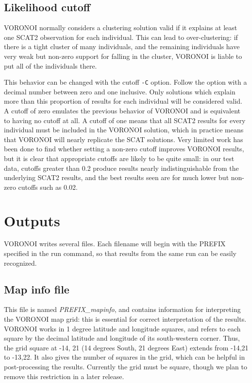 \documentclass[10pt,titlepage,times,letterpaper]{article}
\begin{document}
\subsection{Likelihood cutoff}

VORONOI normally considers a clustering solution valid if it explains at least
one SCAT2 observation for each individual.  This can lead to over-clustering:  if there
is a tight cluster of many individuals, and the remaining individuals have very weak but
non-zero support for falling in the cluster, VORONOI is liable to put all of the individuals
there.

This behavior can be changed with the cutoff {\tt -C} option.  Follow the option with
a decimal number between zero and one inclusive.  Only solutions which explain more
than this proportion of results for each individual will be considered valid.  A cutoff
of zero emulates the previous behavior of VORONOI and is equivalent to having no
cutoff at all.  A cutoff of one means that all SCAT2 results for every individual must
be included in the VORONOI solution, which in practice means that VORONOI will nearly
replicate the SCAT solutions.  Very limited
work has been done to find whether setting a non-zero cutoff improves VORONOI results,
but it is clear that appropriate cutoffs are likely to be quite small:  in our test
data, cutoffs greater than 0.2 produce results nearly indistinguishable from
the underlying SCAT2 results, and the best results seen are for much lower but non-zero
cutoffs such as 0.02.


\section{Outputs}

VORONOI writes several files. Each filename will begin with the PREFIX
specified in the run command, so that results from the same run can be easily
recognized.


\subsection{Map info file}

This file is named {\it PREFIX\_mapinfo}, and contains information for interpreting the
VORONOI map grid:  this is essential for correct interpretation of the results.
VORONOI works in 1 degree latitude and longitude squares, and refers to each
square by the decimal latitude and longitude of its south-western corner.  Thus,
the grid square at -14, 21 (14 degrees South, 21 degrees East) extends from -14,21
to -13,22.  It also gives the number of squares in the grid, which can be helpful
in post-processing the results.  Currently the grid must be square, though we plan
to remove this restriction in a later release.
\end{document}
